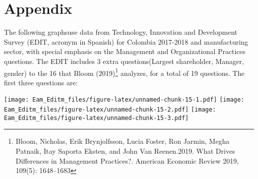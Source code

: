 \documentclass[]{article}
\begin{document}
\hypertarget{appendix}{%
\section{Appendix}\label{appendix}}

The following graphsuse data from Technology, Innovation and Development
Survey (EDIT, acronym in Spanish) for Colombia 2017-2018 and
manufacturing sector, with special emphasis on the Management and
Organizational Practices questions. The EDIT includes 3 extra
questions(Largest shareholder, Manager, gender) to the 16 that Bloom
(2019)\footnote{Bloom, Nicholas, Erik Brynjolfsson, Lucia Foster, Ron
  Jarmin, Megha Patnaik, Itay Saporta Eksten, and John Van Reenen.2019.
  What Drives Differences in Management Practices?. American Economic
  Review 2019, 109(5): 1648--1683} analyzes, for a total of 19
questions. The first three questions are:

\texttt{[image: Eam\_Editm\_files/figure-latex/unnamed-chunk-15-1.pdf]}
\texttt{[image: Eam\_Editm\_files/figure-latex/unnamed-chunk-15-2.pdf]}
\texttt{[image: Eam\_Editm\_files/figure-latex/unnamed-chunk-15-3.pdf]}
\end{document}
